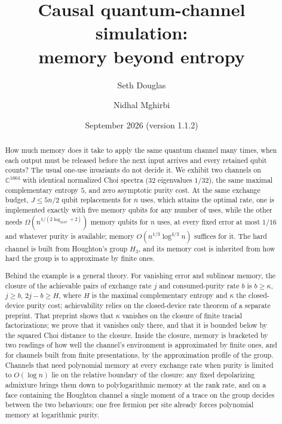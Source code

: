 \documentclass[11pt,a4paper]{article}
\title{Causal quantum-channel simulation:\\[3pt]
\large memory beyond entropy}
\author{Seth Douglas \and Nidhal Mghirbi}
\date{September 2026 (version 1.1.2)}
\theoremstyle{plain}
\theoremstyle{definition}
\theoremstyle{remark}
\begin{document}
\maketitle

\begin{abstract}
How much memory does it take to apply the same quantum channel many times, when each output must be released before the next input arrives and
every retained qubit counts? The usual one-use invariants do not decide it. We exhibit two channels on $\mathbb C^{1664}$ with identical
normalized Choi spectra ($32$ eigenvalues $1/32$), the same maximal complementary entropy $5$, and zero asymptotic purity cost. At the same
exchange budget, $J\le5n/2$ qubit replacements for $n$ uses, which attains the optimal rate, one is implemented exactly with five memory
qubits for any number of uses, while the other needs
$\Omega(n^{1/(2\log_2107+2)})$ memory qubits for $n$ uses, at every fixed error at most $1/16$ and whatever purity is available; memory
$O(n^{1/3}\log^{4/3}n)$ suffices for it. The hard channel is built from Houghton's group $H_3$, and its memory cost is inherited from how hard the
group is to approximate by finite ones.

Behind the example is a general theory. For vanishing error and sublinear memory, the closure of the achievable pairs of exchange rate $j$ and
consumed-purity rate $b$ is $b\ge\kappa$, $j\ge b$, $2j-b\ge H$, where $H$ is the maximal complementary entropy and $\kappa$ the closed-device
purity cost; achievability relies on the closed-device rate theorem of a separate preprint. That preprint shows that $\kappa$ vanishes on the closure
of finite tracial factorizations; we prove that it vanishes only there, and that it is bounded below by the squared Choi distance to the closure. Inside the closure, memory is bracketed by two readings
of how well the channel's environment is approximated by finite ones, and for channels built from finite presentations, by the approximation
profile of the group. Channels that need polynomial memory at every exchange rate when purity is limited to $O(\log n)$ lie on the relative
boundary of the closure: any fixed depolarizing admixture brings them down to polylogarithmic memory at the rank rate, and on a face containing
the Houghton channel a single moment of a trace on the group decides between the two behaviours; one free fermion per site already forces
polynomial memory at logarithmic purity.
\end{abstract}

\begingroup
\setcounter{tocdepth}{2}
\tableofcontents
\endgroup
\end{document}
